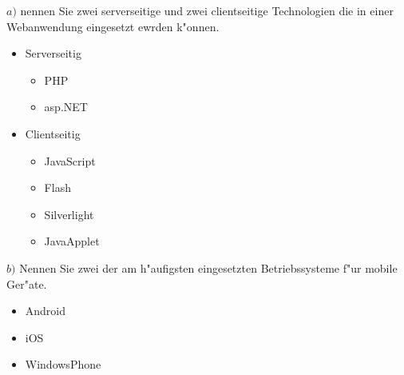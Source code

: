 \noindent
$a)$ nennen Sie zwei serverseitige und zwei clientseitige Technologien die in einer Webanwendung eingesetzt ewrden k"onnen.
\begin{itemize}
    \item Serverseitig
    \begin{itemize}
        \item PHP
        \item asp.NET
    \end{itemize}
    \item Clientseitig
    \begin{itemize}
        \item JavaScript
        \item Flash
        \item Silverlight
        \item JavaApplet
    \end{itemize}
\end{itemize}
\bigskip

\noindent
$b)$ Nennen Sie zwei der am h"aufigsten eingesetzten Betriebssysteme f"ur mobile Ger"ate.\\
\begin{itemize}
    \item Android
    \item iOS
    \item WindowsPhone
\end{itemize}
\bigskip

